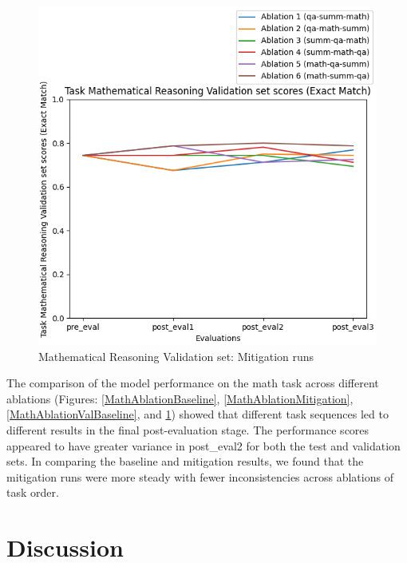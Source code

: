 \begin{figure}[H]
\begin{minipage}{0.45\textwidth}
        \includegraphics[width=1.1\textwidth]{Figures/results/trace_mitigation_graphs/task_eval/math_val_Validation_mitigation.png} %
        \captionsetup{width=1.1\textwidth}
        \caption{Mathematical Reasoning Validation set: Mitigation runs}
        \label{MathAblationValMitigation}
    \end{minipage}
\end{figure}

The comparison of the model performance on the math task across different ablations (Figures: \ref{MathAblationBaseline}, \ref{MathAblationMitigation}, \ref{MathAblationValBaseline}, and \ref{MathAblationValMitigation}) showed that different task sequences led to different results in the final post-evaluation stage. The performance scores appeared to have greater variance in post\_eval2 for both the test and validation sets. In comparing the baseline and mitigation results, we found that the mitigation runs were more steady with fewer inconsistencies across ablations of task order.


\section{Discussion}

\newcommand{\RQone}{How does task-incremental instruction fine-tuning using parameter efficient methods on different tasks influence the retention of the innate capabilities of a pre-trained model:}
\newcommand{\RQonea}{for code pre-trained models in code generation?}

